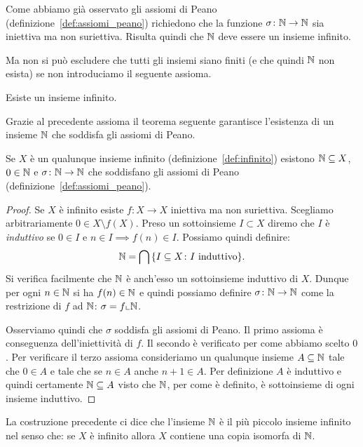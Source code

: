 Come abbiamo già osservato gli assiomi di Peano (definizione~\ref{def:assiomi_peano}) 
richiedono che la funzione $\sigma\colon {\mathbb N}\to{\mathbb N}$ sia iniettiva ma non suriettiva.
Risulta quindi che ${\mathbb N}$ deve essere un insieme infinito.

Ma non si può escludere che tutti gli insiemi siano finiti (e che quindi ${\mathbb N}$ non esista) 
se non introduciamo il seguente assioma.

\begin{axiom}[infinito]
  \label{axiom:infinito}%
  Esiste un insieme infinito. 
\end{axiom}

Grazie al precedente assioma il teorema seguente garantisce
l'esistenza di un insieme ${\mathbb N}$ che soddisfa gli assiomi di Peano.

\begin{theorem}
  \label{th:esistenza_naturali}%
Se $X$ è un qualunque insieme infinito (definizione~\ref{def:infinito})
esistono ${\mathbb N}\subseteq X$, $0\in {\mathbb N}$ e $\sigma\colon {\mathbb N}\to{\mathbb N}$ 
che soddisfano gli assiomi di Peano (definizione~\ref{def:assiomi_peano}).
\end{theorem}
%
\begin{proof}
Se $X$ è infinito esiste $f\colon X\to X$ iniettiva ma non suriettiva. 
Scegliamo arbitrariamente $0\in X\setminus f(X)$. 
Preso un sottoinsieme $I\subset X$ diremo che $I$ è \emph{induttivo}
%
%
se $0\in I$ e $n\in I\implies f(n)\in I$. 
Possiamo quindi definire:
\[
  {\mathbb N} = \bigcap {\left\{ I\subseteq X\colon \text{$I$ induttivo} \right\}}.
\]
Si verifica facilmente che ${\mathbb N}$ è anch'esso un sottoinsieme induttivo di $X$.
Dunque per ogni $n\in {\mathbb N}$ si ha $f(n)\in {\mathbb N}$ e quindi possiamo 
definire $\sigma\colon {\mathbb N}\to {\mathbb N}$ come la restrizione di $f$ 
ad ${\mathbb N}$: $\sigma=f\llcorner {\mathbb N}$.

Osserviamo quindi che $\sigma$ soddisfa gli assiomi di Peano.
Il primo assioma è conseguenza dell'iniettività di $f$.
Il secondo è verificato per come abbiamo scelto $0$.
Per verificare il terzo assioma consideriamo un qualunque insieme 
$A\subseteq {\mathbb N}$ tale che $0\in A$ e tale che se $n\in A$ anche $n+1\in A$.
Per definizione $A$ è induttivo e quindi certamente 
${\mathbb N}\subseteq A$ visto che ${\mathbb N}$, per come è definito,
è sottoinsieme di ogni insieme induttivo.
\end{proof}

La costruzione precedente ci dice che l'insieme ${\mathbb N}$ è il più piccolo insieme infinito
nel senso che: se $X$ è infinito allora $X$ contiene una copia isomorfa di ${\mathbb N}$. 

